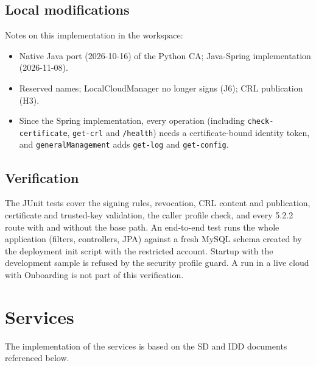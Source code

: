 \documentclass[a4paper]{arrowhead}
\begin{document}
\subsection{Local modifications}
\label{sec:local}

Notes on this implementation in the workspace:
\begin{itemize}
  \item Native Java port (2026-10-16) of the Python CA; Java-Spring implementation (2026-11-08).
  \item Reserved names; LocalCloudManager no longer signs (J6); CRL publication (H3).
  \item Since the Spring implementation, every operation (including \texttt{check-certificate}, \texttt{get-crl} and \texttt{/health}) needs a certificate-bound identity token, and \texttt{generalManagement} adds \texttt{get-log} and \texttt{get-config}.
\end{itemize}

\subsection{Verification}

The JUnit tests cover the signing rules, revocation, CRL content and publication, certificate and trusted-key validation, the caller profile check, and every 5.2.2 route with and without the base path. An end-to-end test runs the whole application (filters, controllers, JPA) against a fresh MySQL schema created by the deployment init script with the restricted account. Startup with the development sample is refused by the security profile guard. A run in a live cloud with Onboarding is not part of this verification.

\newpage

\section{Services}
\label{sec:services}

The implementation of the services is based on the SD and IDD documents referenced below.
\end{document}
